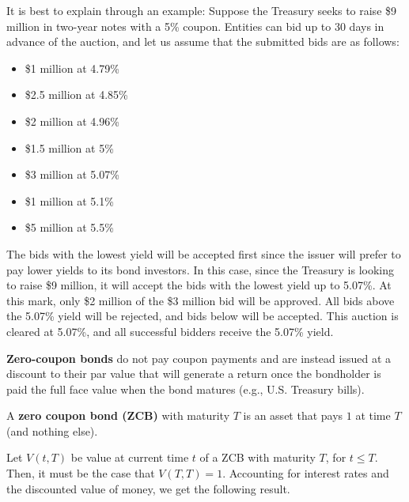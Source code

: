 \documentclass{article}
\begin{document}
    \begin{example}
      It is best to explain through an example: Suppose the Treasury seeks to raise \$9 million in two-year notes with a 5\% coupon. Entities can bid up to 30 days in advance of the auction, and let us assume that the submitted bids are as follows:
      \begin{itemize}
          \item \$1 million at 4.79\%
          \item \$2.5 million at 4.85\%
          \item \$2 million at 4.96\%
          \item \$1.5 million at 5\%
          \item \$3 million at 5.07\%
          \item \$1 million at 5.1\%
          \item \$5 million at 5.5\%
      \end{itemize}
      The bids with the lowest yield will be accepted first since the issuer will prefer to pay lower yields to its bond investors. In this case, since the Treasury is looking to raise \$9 million, it will accept the bids with the lowest yield up to 5.07\%. At this mark, only \$2 million of the \$3 million bid will be approved. All bids above the 5.07\% yield will be rejected, and bids below will be accepted. This auction is cleared at 5.07\%, and all successful bidders receive the 5.07\% yield.
    \end{example}

    \begin{definition}
      \textbf{Zero-coupon bonds} do not pay coupon payments and are instead issued at a discount to their par value that will generate a return once the bondholder is paid the full face value when the bond matures (e.g., U.S. Treasury bills).
    \end{definition}

    \begin{definition}
      A \textbf{zero coupon bond (ZCB)} with maturity $T$ is an asset that pays $1$ at time $T$ (and nothing else). 
    \end{definition}

    Let $V(t, T)$ be value at current time $t$ of a ZCB with maturity $T$, for $t \leq T$. Then, it must be the case that $V(T, T) = 1$. Accounting for interest rates and the discounted value of money, we get the following result. 
\end{document}
